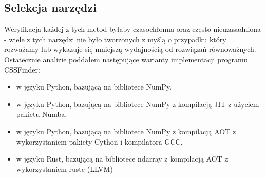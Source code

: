 \documentclass[12pt, a4paper]{article}
\begin{document}
\begin{sloppypar}
    \subsection{Selekcja narzędzi}


    Weryfikacja każdej z tych metod byłaby czasochłonna oraz często nieuzasadniona -
    wiele z tych narzędzi nie było tworzonych z myślą o przypadku który rozważamy lub
    wykazuje się mniejszą wydajnością od rozwiązań równoważnych. Ostatecznie analizie poddałem
    następujące warianty implementacji programu CSSFinder:
    \begin{itemize}
      \item w języku Python, bazującą na bibliotece NumPy,

      \item w języku Python, bazującą na bibliotece NumPy z kompilacją JIT z użyciem
        pakietu Numba,

      \item w języku Python, bazującą na bibliotece NumPy z kompilacją AOT z
        wykorzystaniem pakiety Cython i kompilatora GCC,

      \item w języku Rust, bazującą na bibliotece ndarray z kompilacją AOT z
        wykorzystaniem rustc (LLVM)
    \end{itemize}
  \end{sloppypar}

  \newpage
  \begin{sloppypar}
    \medskip


    \printbibliography
    [heading=bibintoc, title={Odwołania}]
  \end{sloppypar}
\end{document}
